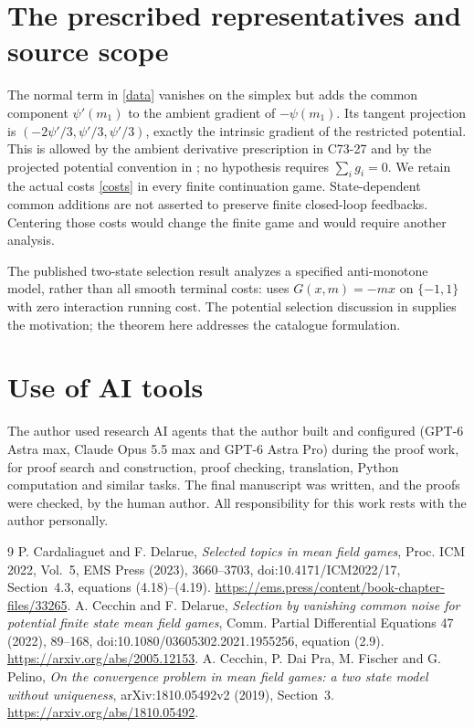 \documentclass[11pt,a4paper]{article}
\begin{document}
\section{The prescribed representatives and source scope}
The normal term in \eqref{data} vanishes on the simplex but adds the
common component $\psi'(m_1)$ to the ambient gradient of $-\psi(m_1)$.
Its tangent projection is $(-2\psi'/3,\psi'/3,\psi'/3)$, exactly the
intrinsic gradient of the restricted potential. This is allowed by
the ambient derivative prescription in C73-27 and by the projected
potential convention in \cite[Eq.~(2.9)]{CeD}; no hypothesis requires
$\sum_i g_i=0$. We retain the actual costs \eqref{costs} in every
finite continuation game. State-dependent common additions are not
asserted to preserve finite closed-loop feedbacks. Centering those
costs would change the finite game and would require another analysis.

The published two-state selection result
analyzes a specified anti-monotone model, rather than all smooth
terminal costs: \cite[Section~3]{CDFP} uses $G(x,m)=-mx$ on
$\{-1,1\}$ with zero interaction running cost. The potential
selection discussion in \cite[Section~4.3]{ICM} supplies the motivation;
the theorem here addresses the catalogue formulation.

\section*{Use of AI tools}
The author used research AI agents that the author built and configured (GPT-6 Astra max,
Claude Opus 5.5 max and GPT-6 Astra Pro) during the proof work, for proof search and
construction, proof checking, translation, Python computation and similar tasks. The final
manuscript was written, and the proofs were checked, by the human author. All responsibility
for this work rests with the author personally.

\begin{thebibliography}{9}
 P. Cardaliaguet and F. Delarue,
\emph{Selected topics in mean field games}, Proc. ICM 2022, Vol.~5,
EMS Press (2023), 3660--3703, doi:10.4171/ICM2022/17,
Section~4.3, equations (4.18)--(4.19).
\url{https://ems.press/content/book-chapter-files/33265}.
 A. Cecchin and F. Delarue,
\emph{Selection by vanishing common noise for potential finite state
mean field games}, Comm. Partial Differential Equations 47 (2022),
89--168, doi:10.1080/03605302.2021.1955256, equation (2.9).
\url{https://arxiv.org/abs/2005.12153}.
 A. Cecchin, P. Dai Pra, M. Fischer and G. Pelino,
\emph{On the convergence problem in mean field games: a two state
model without uniqueness}, arXiv:1810.05492v2 (2019), Section~3.
\url{https://arxiv.org/abs/1810.05492}.
\end{thebibliography}
\end{document}
